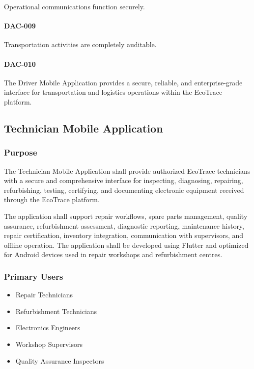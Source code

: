 Operational communications function securely.

\paragraph{DAC-009}

Transportation activities are completely auditable.

\paragraph{DAC-010}

The Driver Mobile Application provides a secure, reliable, and
enterprise-grade interface for transportation and logistics operations
within the EcoTrace platform.

\subsection{Technician Mobile Application}

\subsubsection*{Purpose}

The Technician Mobile Application shall provide authorized EcoTrace
technicians with a secure and comprehensive interface for inspecting,
diagnosing, repairing, refurbishing, testing, certifying, and
documenting electronic equipment received through the EcoTrace platform.

The application shall support repair workflows, spare parts management,
quality assurance, refurbishment assessment, diagnostic reporting,
maintenance history, repair certification, inventory integration,
communication with supervisors, and offline operation. The application
shall be developed using Flutter and optimized for Android devices used
in repair workshops and refurbishment centres.


\subsubsection*{Primary Users}

\begin{itemize}

\item Repair Technicians

\item Refurbishment Technicians

\item Electronics Engineers

\item Workshop Supervisors

\item Quality Assurance Inspectors

\end{itemize}


